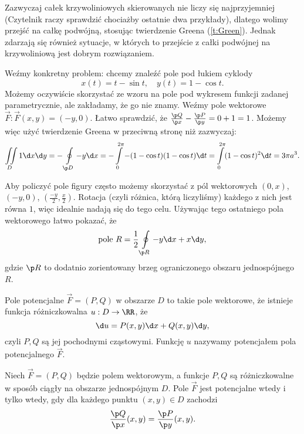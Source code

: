 \begin{remark}
    Zazwyczaj całek krzywoliniowych skierowanych nie liczy się najprzyjemniej (Czytelnik raczy sprawdzić chociażby ostatnie dwa przykłady), dlatego wolimy przejść na całkę podwójną, stosując twierdzenie Greena (\ref{t:Green}). Jednak zdarzają się również sytuacje, w których to przejście z całki podwójnej na krzywoliniową jest dobrym rozwiązaniem.

    Weźmy konkretny problem: chcemy znaleźć pole pod łukiem cyklody
    \[ x(t) = t - \sin t, \quad y(t) = 1 - \cos t. \]
    Możemy oczywiście skorzystać ze wzoru na pole pod wykresem funkcji zadanej parametrycznie, ale zakładamy, że go nie znamy. Weźmy pole wektorowe $\vec{F} : \vec{F}(x, y) = (-y, 0)$. Łatwo sprawdzić, że $\frac{\p Q}{\p x} - \frac{\p P}{\p y} = 0 + 1 = 1$. Możemy więc użyć twierdzenie Greena w przeciwną stronę niż zazwyczaj:
    \[ \iint\limits_D 1 \d x \d y = -\oint\limits_{\p D} -y \d x = -\int\limits_0^{2\pi} -(1 - \cos t)(1 - \cos t) \d t = \int\limits_0^{2\pi} (1 - \cos t)^2 \d t = 3\pi a^3.\]

    Aby policzyć pole figury często możemy skorzystać z pól wektorowych $(0, x)$, $(-y, 0)$, $\left(\frac{-y}{2}, \frac{x}{2}\right)$. Rotacja (czyli różnica, którą liczyliśmy) każdego z nich jest równa $1$, więc idealnie nadają się do tego celu. Używając tego ostatniego pola wektorowego łatwo pokazać, że
    \begin{equation}
        \text{pole } R = \frac{1}{2}\oint\limits_{\p R} -y \d x + x \d y,
    \end{equation}
    gdzie $\p R$ to dodatnio zorientowany brzeg ograniczonego obszaru jednospójnego $R$.
\end{remark}

\begin{definition}
    Pole potencjalne $\vec{F} = (P, Q)$ w obszarze $D$ to takie pole wektorowe, że istnieje funkcja różniczkowalna $u : D \to \RR$, że
    \[ \d u = P(x, y) \d x + Q(x, y) \d y, \]
    czyli $P, Q$ są jej pochodnymi cząstowymi. Funkcję $u$ nazywamy potencjałem pola potencjalnego $\vec{F}$.
\end{definition}

\begin{theorem}
    \label{t:necessary and sufficient condition for field potentiality}
    Niech $\vec{F} = (P, Q)$ będzie polem wektorowym, a funkcje $P, Q$ są różniczkowalne w sposób ciągły na obszarze jednospójnym $D$. Pole $\vec{F}$ jest potencjalne wtedy i tylko wtedy, gdy dla każdego punktu $(x, y) \in D$ zachodzi
    \[ \frac{\p Q}{\p x}(x, y) = \frac{\p P}{\p y}(x, y). \]
\end{theorem}

